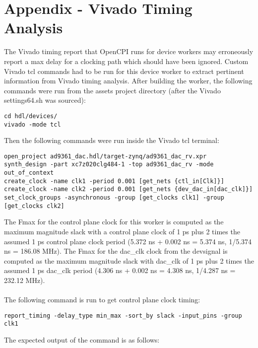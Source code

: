 \documentclass{article}
\begin{document}
\section{Appendix - Vivado Timing Analysis} \label{appendix}

The Vivado timing report that OpenCPI runs for device workers may erroneously report a max delay for a clocking path which should have been ignored. Custom Vivado tcl commands had to be run for this device worker to extract pertinent information from Vivado timing analysis. After building the worker, the following commands were run from the assets project directory (after the Vivado settings64.sh was sourced):
\begin{lstlisting}
cd hdl/devices/
vivado -mode tcl
\end{lstlisting}
Then the following commands were run inside the Vivado tcl terminal:
\begin{lstlisting}
open_project ad9361_dac.hdl/target-zynq/ad9361_dac_rv.xpr
synth_design -part xc7z020clg484-1 -top ad9361_dac_rv -mode out_of_context
create_clock -name clk1 -period 0.001 [get_nets {ctl_in[Clk]}]
create_clock -name clk2 -period 0.001 [get_nets {dev_dac_in[dac_clk]}]
set_clock_groups -asynchronous -group [get_clocks clk1] -group [get_clocks clk2]
\end{lstlisting}
The Fmax for the control plane clock for this worker is computed as the maximum magnitude slack with a control plane clock of 1 ps plus 2 times the assumed 1 ps control plane clock period (5.372 ns + 0.002 ns = 5.374 ns, 1/5.374 ns = 186.08 MHz). The Fmax for the dac\_clk clock from the devsignal is computed as the maximum magnitude slack with dac\_clk of 1 ps plus 2 times the assumed 1 ps dac\_clk period (4.306 ns + 0.002 ns = 4.308 ns, 1/4.287 ns = 232.12 MHz). \\ \\
The following command is run to get control plane clock timing:
\begin{lstlisting}
report_timing -delay_type min_max -sort_by slack -input_pins -group clk1
\end{lstlisting}
The expected output of the command is as follows:
\fontsize{6}{12}\selectfont
\end{document}

